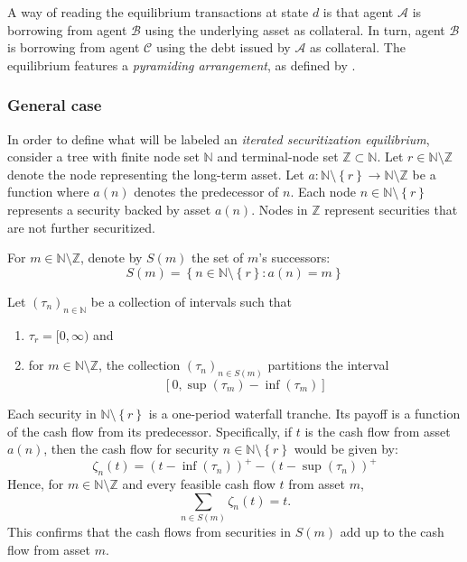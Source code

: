 \documentclass[11pt]{article}
\theoremstyle{plain}
\begin{document}
A way of reading the equilibrium transactions at state $d$ is that agent $\mathcal{A}$ is borrowing from agent $\mathcal{B}$ using the underlying asset as collateral. In turn, agent $\mathcal{B}$ is borrowing from agent $\mathcal{C}$ using the debt issued by $\mathcal{A}$ as collateral. The equilibrium features a \textit{pyramiding arrangement}, as defined by \cite{Geanakoplos1996}.

\subsubsection{General case}

In order to define what will be labeled an \textit{iterated securitization equilibrium}, consider a tree with finite node set $\mathbb{N}$ and terminal-node set $\mathbb{Z}\subset\mathbb{N}$. Let $r\in\mathbb{N}\setminus\mathbb{Z}$ denote the node representing the long-term asset. Let $a:\mathbb{N}\setminus\left\{r\right\}\to\mathbb{N}\setminus\mathbb{Z}$ be a function where $a(n)$ denotes the predecessor of $n$. Each node $n\in\mathbb{N}\setminus\left\{r\right\}$ represents a security backed by asset $a(n)$. Nodes in $\mathbb{Z}$ represent securities that are not further securitized.

For $m\in\mathbb{N}\setminus\mathbb{Z}$, denote by $S(m)$ the set of $m$'s successors:
\[
S(m) = \left\{ n \in \mathbb{N}\setminus \left\{r\right\} : a(n)=m \right\}
\]

Let $(\tau_n)_{n\in\mathbb{N}}$ be a collection of intervals such that
\begin{enumerate}
\item $\tau_r=[0,\infty)$ and
\item for $m\in\mathbb{N}\setminus\mathbb{Z}$, the collection $(\tau_n)_{n\in S(m)}$ partitions the interval \[[0,\sup(\tau_{m})-\inf(\tau_{m})]\]
\end{enumerate}

Each security in $\mathbb{N}\setminus\left\{r\right\}$ is a one-period waterfall tranche. Its payoff is a function of the cash flow from its predecessor. Specifically, if $t$ is the cash flow from asset $a(n)$, then the cash flow for security $n\in\mathbb{N}\setminus\left\{r\right\}$ would be given by:
\begin{equation} \label{eq:psi}
\zeta_n(t) = (t-\inf(\tau_n))^+ - (t-\sup(\tau_n))^+
\end{equation}
Hence, for $m\in\mathbb{N}\setminus\mathbb{Z}$ and every feasible cash flow $t$ from asset $m$,
\begin{equation*}
\sum_{n\in S(m)}\zeta_{n}(t)=t.
\end{equation*}
This confirms that the cash flows from securities in $S(m)$ add up to the cash flow from asset $m$.
\end{document}
